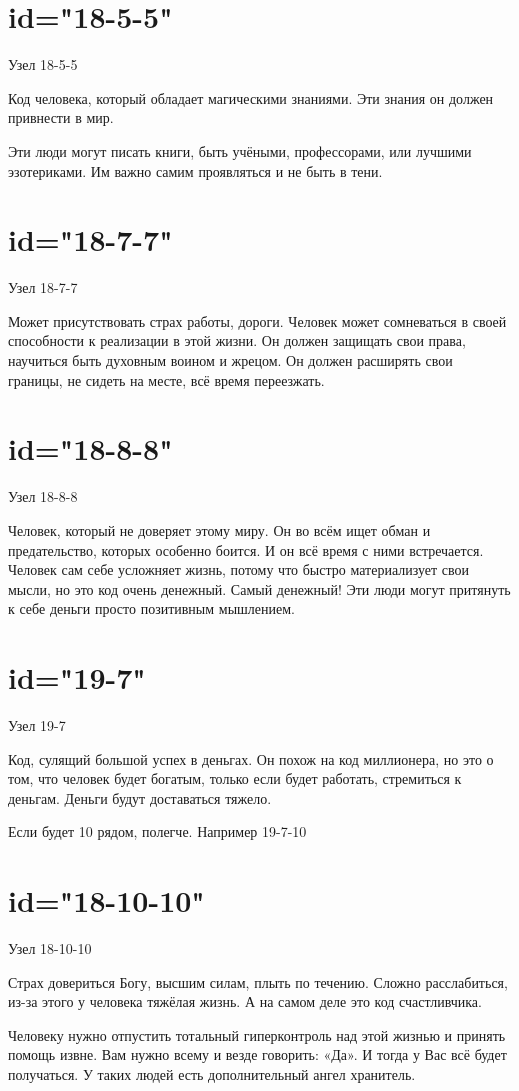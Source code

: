 \section{id="18-5-5"}{Узел 18-5-5}
\item Код человека, который обладает магическими знаниями. 
Эти знания он должен привнести в мир.
\item Эти люди могут писать книги, быть учёными, профессорами, 
или лучшими эзотериками. Им важно самим проявляться и не быть 
в тени.
\endsection

\section{id="18-7-7"}{Узел 18-7-7}
\item Может присутствовать страх работы, дороги. Человек может 
сомневаться в своей способности к реализации в этой жизни. 
Он должен защищать свои права, научиться быть духовным воином 
и жрецом. Он должен расширять свои границы, не сидеть на месте, 
всё время переезжать.
\endsection

\section{id="18-8-8"}{Узел 18-8-8}
\item Человек, который не доверяет этому миру. Он во всём ищет 
обман и предательство, которых особенно боится. И он всё время 
с ними встречается. Человек сам себе усложняет жизнь, потому 
что быстро материализует свои мысли, но это код очень денежный. 
Самый денежный! Эти люди могут притянуть к себе деньги просто 
позитивным мышлением.
\endsection

\section{id="19-7"}{Узел 19-7}
\item Код, сулящий большой успех в деньгах. Он похож на код 
миллионера, но это о том, что человек будет богатым, только 
если будет работать, стремиться к деньгам. Деньги будут 
доставаться тяжело.
\item Если будет 10 рядом, полегче. Например 19-7-10
\endsection

\section{id="18-10-10"}{Узел 18-10-10}
\item Страх довериться Богу, высшим силам, плыть по течению. 
Сложно расслабиться, из-за этого у человека тяжёлая жизнь. 
А на самом деле это код счастливчика.
\item Человеку нужно отпустить тотальный гиперконтроль над 
этой жизнью и принять помощь извне. Вам нужно всему и везде 
говорить: «Да». И тогда у Вас всё будет получаться. У таких 
людей есть дополнительный ангел хранитель.
\endsection

